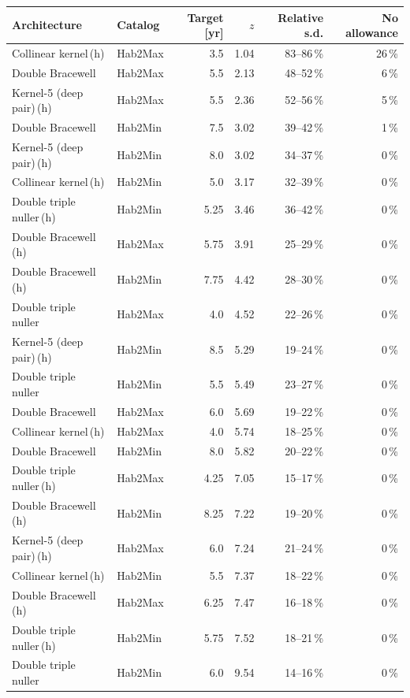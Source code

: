\documentclass[12pt,a4paper]{article}
\numberwithin{equation}{section}
\numberwithin{figure}{section}
\numberwithin{table}{section}
\begin{document}
\begin{table}[htbp]
\centering
\small
\begin{tabular}{@{}llrrrr@{}}
\toprule
Architecture & Catalog & Target [yr] & $z$ & Relative s.d. & No allowance \\
\midrule
Collinear kernel\,(h) & Hab2Max & 3.5 & 1.04 & 83--86\,\% & 26\,\% \\
Double Bracewell & Hab2Max & 5.5 & 2.13 & 48--52\,\% & 6\,\% \\
Kernel-5 (deep pair)\,(h) & Hab2Max & 5.5 & 2.36 & 52--56\,\% & 5\,\% \\
Double Bracewell & Hab2Min & 7.5 & 3.02 & 39--42\,\% & 1\,\% \\
Kernel-5 (deep pair)\,(h) & Hab2Min & 8.0 & 3.02 & 34--37\,\% & 0\,\% \\
Collinear kernel\,(h) & Hab2Min & 5.0 & 3.17 & 32--39\,\% & 0\,\% \\
Double triple nuller\,(h) & Hab2Min & 5.25 & 3.46 & 36--42\,\% & 0\,\% \\
Double Bracewell\,(h) & Hab2Max & 5.75 & 3.91 & 25--29\,\% & 0\,\% \\
Double Bracewell\,(h) & Hab2Min & 7.75 & 4.42 & 28--30\,\% & 0\,\% \\
Double triple nuller & Hab2Max & 4.0 & 4.52 & 22--26\,\% & 0\,\% \\
Kernel-5 (deep pair)\,(h) & Hab2Min & 8.5 & 5.29 & 19--24\,\% & 0\,\% \\
Double triple nuller & Hab2Min & 5.5 & 5.49 & 23--27\,\% & 0\,\% \\
Double Bracewell & Hab2Max & 6.0 & 5.69 & 19--22\,\% & 0\,\% \\
Collinear kernel\,(h) & Hab2Max & 4.0 & 5.74 & 18--25\,\% & 0\,\% \\
Double Bracewell & Hab2Min & 8.0 & 5.82 & 20--22\,\% & 0\,\% \\
Double triple nuller\,(h) & Hab2Max & 4.25 & 7.05 & 15--17\,\% & 0\,\% \\
Double Bracewell\,(h) & Hab2Min & 8.25 & 7.22 & 19--20\,\% & 0\,\% \\
Kernel-5 (deep pair)\,(h) & Hab2Max & 6.0 & 7.24 & 21--24\,\% & 0\,\% \\
Collinear kernel\,(h) & Hab2Min & 5.5 & 7.37 & 18--22\,\% & 0\,\% \\
Double Bracewell\,(h) & Hab2Max & 6.25 & 7.47 & 16--18\,\% & 0\,\% \\
Double triple nuller\,(h) & Hab2Min & 5.75 & 7.52 & 18--21\,\% & 0\,\% \\
Double triple nuller & Hab2Min & 6.0 & 9.54 & 14--16\,\% & 0\,\% \\

\end{tabular}
\end{table}
\end{document}
